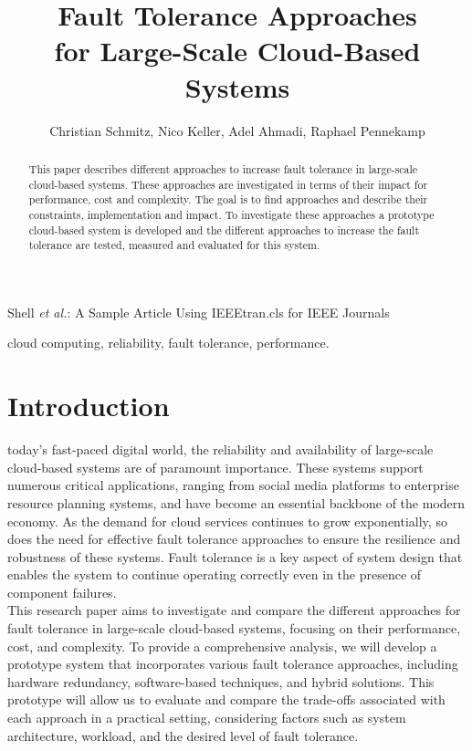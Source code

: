 \documentclass[lettersize,journal]{IEEEtran}
\begin{document}
\title{Fault Tolerance Approaches\\ for Large-Scale Cloud-Based Systems}

\author{Christian Schmitz, Nico Keller, Adel Ahmadi, Raphael Pennekamp}

%
{Shell \MakeLowercase{\textit{et al.}}: A Sample Article Using IEEEtran.cls for IEEE Journals}

\maketitle
\begin{abstract}
This paper describes different approaches to increase fault tolerance in large-scale cloud-based systems. These approaches are investigated in terms of their impact for performance, cost and complexity. The goal is to find approaches and describe their constraints, implementation and impact. To investigate these approaches a prototype cloud-based system is developed and the different approaches to increase the fault tolerance are tested, measured and evaluated for this system.
\end{abstract}

\begin{IEEEkeywords}
cloud computing, reliability, fault tolerance, performance.
\end{IEEEkeywords}

\section{Introduction} 
  today's fast-paced digital world, the reliability and availability of large-scale cloud-based systems are of paramount importance. These systems support numerous critical applications, ranging from social media platforms to enterprise resource planning systems, and have become an essential backbone of the modern economy. As the demand for cloud services continues to grow exponentially, so does the need for effective fault tolerance approaches to ensure the resilience and robustness of these systems. Fault tolerance is a key aspect of system design that enables the system to continue operating correctly even in the presence of component failures.\\

\noindent This research paper aims to investigate and compare the different approaches for fault tolerance in large-scale cloud-based systems, focusing on their performance, cost, and complexity. To provide a comprehensive analysis, we will develop a prototype system that incorporates various fault tolerance approaches, including hardware redundancy, software-based techniques, and hybrid solutions. This prototype will allow us to evaluate and compare the trade-offs associated with each approach in a practical setting, considering factors such as system architecture, workload, and the desired level of fault tolerance. 
\end{document}
